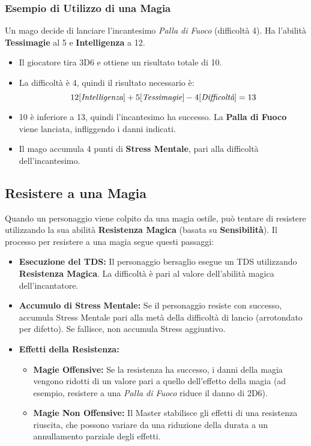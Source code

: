 \documentclass[../manuale_main.tex]{subfiles}
\begin{document}
\subsubsection{Esempio di Utilizzo di una Magia}
Un mago decide di lanciare l'incantesimo \textit{Palla di Fuoco} (difficoltà 4). Ha l'abilità \textbf{Tessimagie} al 5 e \textbf{Intelligenza} a 12.

\begin{itemize}
    \item Il giocatore tira 3D6 e ottiene un risultato totale di 10.
    \item La difficoltà è 4, quindi il risultato necessario è: 
    \[
    12 [\emph{Intelligenza}] + 5 [\emph{Tessimagie}] - 4 [\emph{Difficoltà}] = 13
    \]
    \item 10 è inferiore a 13, quindi l'incantesimo ha successo. La \textbf{Palla di Fuoco} viene lanciata, infliggendo i danni indicati.
    \item Il mago accumula 4 punti di \textbf{Stress Mentale}, pari alla difficoltà dell'incantesimo.
\end{itemize}

\subsection{Resistere a una Magia}
Quando un personaggio viene colpito da una magia ostile, può tentare di resistere utilizzando la sua abilità \textbf{Resistenza Magica} (basata su \textbf{Sensibilità}). Il processo per resistere a una magia segue questi passaggi:

\begin{itemize}
    \item \textbf{Esecuzione del TDS:} Il personaggio bersaglio esegue un TDS utilizzando \textbf{Resistenza Magica}. La difficoltà è pari al valore dell'abilità magica dell'incantatore.
    \item \textbf{Accumulo di Stress Mentale:} Se il personaggio resiste con successo, accumula Stress Mentale pari alla metà della difficoltà di lancio (arrotondato per difetto). Se fallisce, non accumula Stress aggiuntivo.
    \item \textbf{Effetti della Resistenza:}
    \begin{itemize}
        \item \textbf{Magie Offensive:} Se la resistenza ha successo, i danni della magia vengono ridotti di un valore pari a quello dell'effetto della magia (ad esempio, resistere a una \textit{Palla di Fuoco} riduce il danno di 2D6).
        \item \textbf{Magie Non Offensive:} Il Master stabilisce gli effetti di una resistenza riuscita, che possono variare da una riduzione della durata a un annullamento parziale degli effetti.
    \end{itemize}
\end{itemize}
\end{document}
